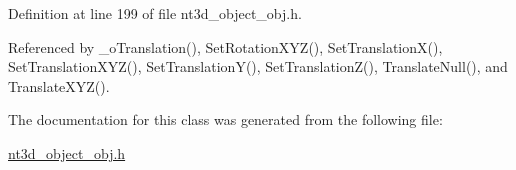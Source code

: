 Definition at line 199 of file nt3d\_\-object\_\-obj.h.



Referenced by \_\-oTranslation(), SetRotationXYZ(), SetTranslationX(), SetTranslationXYZ(), SetTranslationY(), SetTranslationZ(), TranslateNull(), and TranslateXYZ().



The documentation for this class was generated from the following file:\begin{DoxyCompactItemize}
\item 
\hyperlink{nt3d__object__obj_8h}{nt3d\_\-object\_\-obj.h}\end{DoxyCompactItemize}
